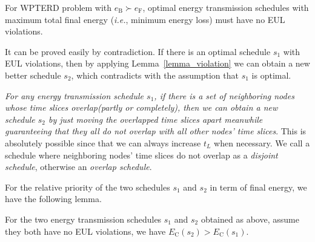 \documentclass[12pt,journal,onecolumn,draftcls]{IEEEtran}
\begin{document}
\begin{theorem}
\label{theorem_no_violation}
For WPTERD problem with $e_\text{B}{\succ}e_\text{F}$, optimal energy transmission schedules with maximum total final energy (\textit{i.e.}, minimum energy loss) must have no EUL violations.
\end{theorem}

\begin{IEEEproof}
It can be proved easily by contradiction. If there is an optimal schedule $s_1$ with EUL violations, then by applying Lemma~\ref{lemma_violation} we can obtain a new better schedule $s_2$, which contradicts with the assumption that $s_1$ is optimal.
\end{IEEEproof}

\textit{For any energy transmission schedule $s_1$, if there is a set of neighboring nodes whose time slices overlap(partly or completely), then we can obtain a new schedule $s_{2}$ by just moving the overlapped time slices apart meanwhile guaranteeing that they all do not overlap with all other nodes' time slices}. This is absolutely possible since that we can always increase $t_L$ when necessary. We call a schedule where neighboring nodes' time slices do not overlap as a \textit{disjoint schedule}, otherwise an \textit{overlap schedule}.

For the relative priority of the two schedules $s_1$ and $s_2$ in term of final energy, we have the following lemma.

\begin{lemma}
\label{lemma_interval_disjoint}
For the two energy transmission schedules $s_1$ and $s_2$ obtained as above, assume they both have no EUL violations, we have $E_\text{C}(s_2){>}E_\text{C}(s_1)$.
\end{lemma}
\end{document}
